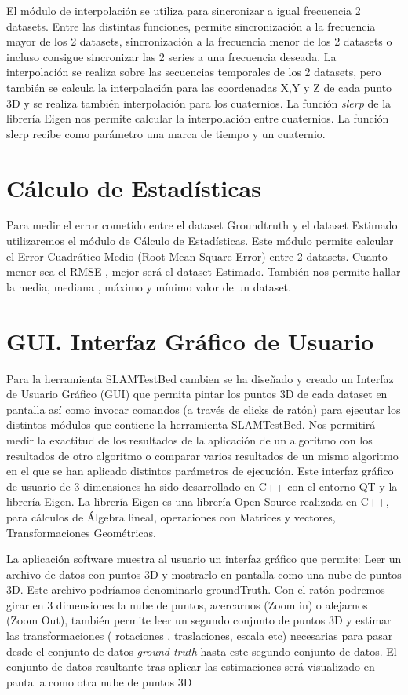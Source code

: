 	El módulo de interpolación se utiliza para sincronizar a igual frecuencia 2 datasets.
	Entre las distintas funciones, permite sincronización a la frecuencia mayor de los 2 datasets, sincronización a la frecuencia menor de los 2 datasets o incluso consigue sincronizar las 2 series a una frecuencia deseada. La interpolación se realiza sobre las secuencias temporales de los 2 datasets, pero también se calcula la interpolación para las coordenadas X,Y y Z de cada punto 3D y se realiza también interpolación para los cuaternios. La función \textit{slerp} de la librería Eigen nos permite calcular la interpolación entre cuaternios. La función slerp recibe como parámetro una marca de tiempo y un cuaternio.

\section{Cálculo de Estadísticas}

Para medir el error cometido entre el dataset Groundtruth y el dataset Estimado utilizaremos el módulo de Cálculo de Estadísticas.
Este módulo permite calcular el Error Cuadrático Medio (Root Mean Square Error) entre 2 datasets.
Cuanto menor sea el RMSE , mejor será el dataset Estimado.
También nos permite hallar la media, mediana , máximo y mínimo valor de un dataset.


\section{GUI. Interfaz Gráfico de Usuario}

Para la herramienta SLAMTestBed cambien se ha diseñado y creado un Interfaz de Usuario Gráfico (GUI) que permita pintar los puntos 3D de cada dataset en pantalla así como invocar comandos (a través de clicks de ratón) para ejecutar los distintos módulos que contiene la herramienta SLAMTestBed.
Nos permitirá medir la exactitud de los resultados de la aplicación de un algoritmo con los resultados de otro algoritmo o comparar varios resultados de un mismo algoritmo en el que se han aplicado distintos parámetros de ejecución.
Este interfaz gráfico de usuario de 3 dimensiones ha sido desarrollado en C++ con el entorno QT y la librería Eigen. La librería Eigen es una librería Open Source realizada en C++, para cálculos de Álgebra lineal, operaciones con Matrices y vectores, Transformaciones Geométricas. 

La aplicación software muestra al usuario un interfaz gráfico que permite:
Leer un archivo de datos con puntos 3D y mostrarlo en pantalla como una nube de puntos 3D. Este archivo podríamos denominarlo groundTruth.
Con el ratón podremos girar en 3 dimensiones la nube de puntos, acercarnos  (Zoom in) o alejarnos (Zoom Out),
también permite leer un segundo conjunto de puntos 3D y estimar las transformaciones ( rotaciones , traslaciones, escala etc)  necesarias para pasar desde el conjunto de datos \textit{ground truth} hasta este segundo conjunto de datos. El conjunto de datos resultante tras aplicar las estimaciones será visualizado en pantalla como otra nube de puntos 3D

